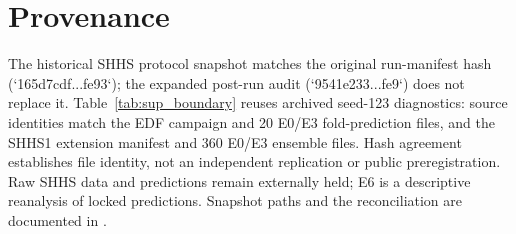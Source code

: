 \documentclass[10pt,a4paper]{article}
\begin{document}
\section*{Provenance}
\enlargethispage{4\baselineskip}

The historical SHHS protocol snapshot matches the original run-manifest hash
(`165d7cdf...fe93`); the expanded post-run audit (`9541e233...fe9`) does not replace it.
Table~\ref{tab:sup_boundary} reuses archived seed-123 diagnostics: source identities match the EDF
campaign and 20 E0/E3 fold-prediction files, and the SHHS1 extension manifest and 360 E0/E3 ensemble
files. Hash agreement establishes file identity, not an independent replication or public
preregistration. Raw SHHS data and predictions remain externally held; E6 is a descriptive
reanalysis of locked predictions. Snapshot paths and the reconciliation are documented in
.
\end{document}
